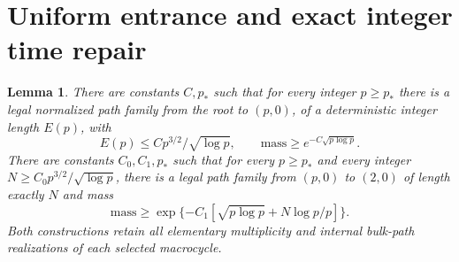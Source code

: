 \documentclass[11pt,letterpaper]{article}
\newtheorem{lemma}[theorem]{Lemma}
\theoremstyle{remark}\newtheorem{remark}[theorem]{Remark}
\numberwithin{equation}{section}
\begin{document}
\section{Uniform entrance and exact integer time repair}\label{ivd:sh:sec:entrance}
\begin{lemma}\label{ivd:sh:lem:entrance}
There are constants $C,p_*$ such that for every integer $p\ge p_*$
there is a legal normalized path family from the root to $(p,0)$,
of a deterministic integer length $E(p)$, with
\begin{equation}\label{ivd:sh:eq:entrance}
 E(p)\le C p^{3/2}/\sqrt{\log p},\qquad
 \text{mass}\ge e^{-C\sqrt{p\log p}}.
\end{equation}
There are constants $C_0,C_1,p_*$ such that for every $p\ge p_*$
and every integer $N\ge C_0p^{3/2}/\sqrt{\log p}$, there is a legal
path family from $(p,0)$ to $(2,0)$ of length exactly $N$ and mass
\begin{equation}\label{ivd:sh:eq:repair}
 \text{mass}\ge
 \exp\{-C_1[\sqrt{p\log p}+N\log p/p]\}.
\end{equation}
Both constructions retain all elementary multiplicity and internal
bulk-path realizations of each selected macrocycle.
\end{lemma}
\end{document}
